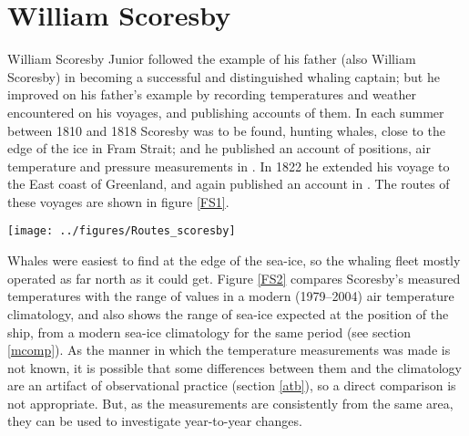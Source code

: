 \documentclass[CP]{copernicus}
\begin{document}
\section{William Scoresby}

William Scoresby Junior followed the example of his father (also William Scoresby) in becoming a successful and distinguished whaling captain; but he improved on his father's example by recording temperatures and weather encountered on his voyages, and publishing accounts of them. In each summer between 1810 and 1818 Scoresby was to be found, hunting whales, close to the edge of the ice in Fram Strait; and he published an account of positions, air temperature and pressure measurements in \citet{scoresby_1820}. In 1822 he extended his voyage to the East coast of Greenland, and again published an account in \citet{scoresby_1823}. The routes of these voyages are shown in figure \ref{FS1}.
\begin{figure*}[!hbp]
\begin{center}
\texttt{[image: ../figures/Routes\_scoresby]}
\caption{Routes of William Scoresby's whaling voyages. Except for the trip to Greenland in 1822, all the voyages were similar in the area covered, so only 5 of the 10 annual voyages are plotted, to avoid muddying the figure. The broad grey line is the September sea-ice edge from \citet{rayner03HadISST1}, median value over 1979--2004.}
\label{FS1}
\end{center}
\end{figure*}

Whales were easiest to find at the edge of the sea-ice, so the whaling fleet mostly operated as far north as it could get. Figure \ref{FS2} compares Scoresby's measured temperatures with the range of values in a modern (1979--2004) air temperature climatology, and also shows the range of sea-ice expected at the position of the ship, from a modern sea-ice climatology for the same period (see section \ref{mcomp}). As the manner in which the temperature measurements was made is not known, it is possible that some differences between them and the climatology are an artifact of observational practice (section \ref{atb}), so a direct comparison is not appropriate. But, as the measurements are consistently from the same area, they can be used to investigate year-to-year changes.
\end{document}
